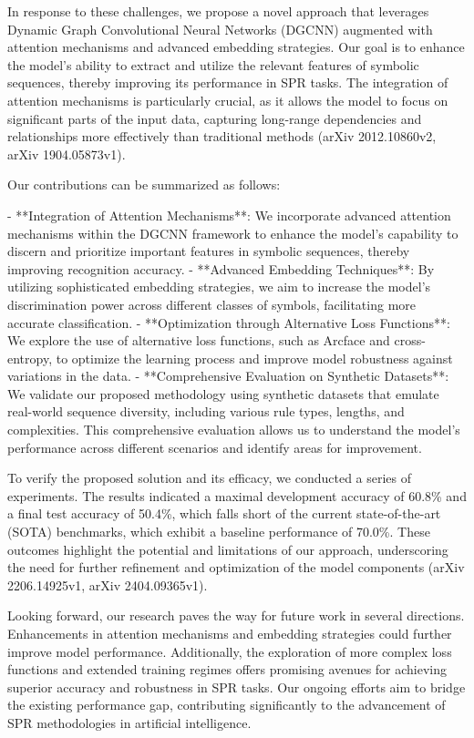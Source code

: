 \documentclass{article}
\begin{document}
In response to these challenges, we propose a novel approach that leverages Dynamic Graph Convolutional Neural Networks (DGCNN) augmented with attention mechanisms and advanced embedding strategies. Our goal is to enhance the model's ability to extract and utilize the relevant features of symbolic sequences, thereby improving its performance in SPR tasks. The integration of attention mechanisms is particularly crucial, as it allows the model to focus on significant parts of the input data, capturing long-range dependencies and relationships more effectively than traditional methods (arXiv 2012.10860v2, arXiv 1904.05873v1).

Our contributions can be summarized as follows:

- **Integration of Attention Mechanisms**: We incorporate advanced attention mechanisms within the DGCNN framework to enhance the model's capability to discern and prioritize important features in symbolic sequences, thereby improving recognition accuracy.
- **Advanced Embedding Techniques**: By utilizing sophisticated embedding strategies, we aim to increase the model's discrimination power across different classes of symbols, facilitating more accurate classification.
- **Optimization through Alternative Loss Functions**: We explore the use of alternative loss functions, such as Arcface and cross-entropy, to optimize the learning process and improve model robustness against variations in the data.
- **Comprehensive Evaluation on Synthetic Datasets**: We validate our proposed methodology using synthetic datasets that emulate real-world sequence diversity, including various rule types, lengths, and complexities. This comprehensive evaluation allows us to understand the model's performance across different scenarios and identify areas for improvement.

To verify the proposed solution and its efficacy, we conducted a series of experiments. The results indicated a maximal development accuracy of 60.8\% and a final test accuracy of 50.4\%, which falls short of the current state-of-the-art (SOTA) benchmarks, which exhibit a baseline performance of 70.0\%. These outcomes highlight the potential and limitations of our approach, underscoring the need for further refinement and optimization of the model components (arXiv 2206.14925v1, arXiv 2404.09365v1).

Looking forward, our research paves the way for future work in several directions. Enhancements in attention mechanisms and embedding strategies could further improve model performance. Additionally, the exploration of more complex loss functions and extended training regimes offers promising avenues for achieving superior accuracy and robustness in SPR tasks. Our ongoing efforts aim to bridge the existing performance gap, contributing significantly to the advancement of SPR methodologies in artificial intelligence.
\end{document}
